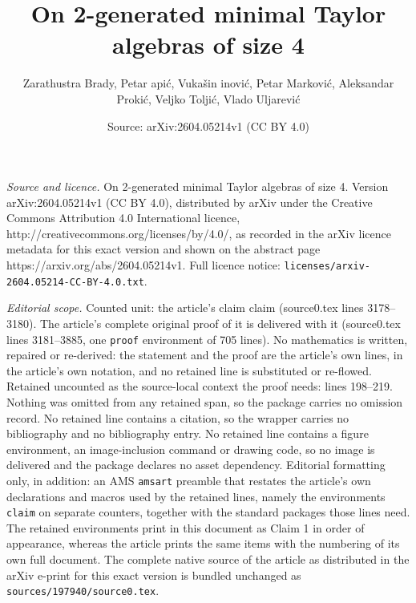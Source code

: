 \documentclass[10pt,a4paper]{amsart}
\title{On 2-generated minimal Taylor algebras of size 4}
\author{Zarathustra Brady, Petar {\DJ}api\'c, Vuka\v{s}in {\DJ}inovi\'c, Petar Markovi\'c, Aleksandar Proki\'c, Veljko Tolji\'c, Vlado Uljarevi\'c}
\date{Source: arXiv:2604.05214v1 (CC BY 4.0)}
\begin{document}
\maketitle

\noindent\emph{Source and licence.} On 2-generated minimal Taylor algebras of size 4. Version arXiv:2604.05214v1 (CC BY 4.0), distributed by arXiv under the Creative Commons Attribution 4.0 International licence, http://creativecommons.org/licenses/by/4.0/, as recorded in the arXiv licence metadata for this exact version and shown on the abstract page https://arxiv.org/abs/2604.05214v1. Full licence notice: \texttt{licenses/arxiv-2604.05214-CC-BY-4.0.txt}.\par\smallskip

\noindent\textit{Editorial scope.} Counted unit: the article's claim claim (source0.tex lines 3178--3180). The article's complete original proof of it is delivered with it (source0.tex lines 3181--3885, one \texttt{proof} environment of 705 lines). No mathematics is written, repaired or re-derived: the statement and the proof are the article's own lines, in the article's own notation, and no retained line is substituted or re-flowed.  Retained uncounted as the source-local context the proof needs: lines 198--219.  Nothing was omitted from any retained span, so the package carries no omission record.  No retained line contains a citation, so the wrapper carries no bibliography and no bibliography entry.  No retained line contains a figure environment, an image-inclusion command or drawing code, so no image is delivered and the package declares no asset dependency.  Editorial formatting only, in addition: an AMS \texttt{amsart} preamble that restates the article's own declarations and macros used by the retained lines, namely the environments \texttt{claim} on separate counters, together with the standard packages those lines need.  The retained environments print in this document as Claim 1 in order of appearance, whereas the article prints the same items with the numbering of its own full document.  The complete native source of the article as distributed in the arXiv e-print for this exact version is bundled unchanged as \texttt{sources/197940/source0.tex}.
\end{document}
